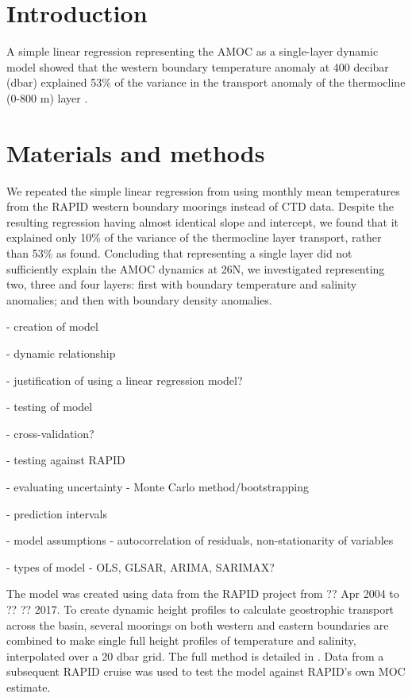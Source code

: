 \documentclass[a4paper,fleqn]{cas-sc}
\begin{document}
\maketitle


\section{Introduction}

A simple linear regression representing the AMOC as a single-layer dynamic model showed that the western boundary temperature anomaly at 400 decibar (dbar) explained 53\% of the variance in the transport anomaly of the thermocline (0-800 m) layer \citep{longworth2011}.

\section{Materials and methods}

We repeated the simple linear regression from \citet{longworth2011} using monthly mean temperatures from the RAPID western boundary moorings instead of CTD data. Despite the resulting regression having almost identical slope and intercept, we found that it explained only 10\% of the variance of the thermocline layer transport, rather than 53\% as \citet{longworth2011} found. Concluding that representing a single layer did not sufficiently explain the AMOC dynamics at 26\textdegree N, we investigated representing two, three and four layers: first with boundary temperature and salinity anomalies; and then with boundary density anomalies.

- creation of model

- dynamic relationship

- justification of using a linear regression model?

- testing of model

- cross-validation?

- testing against RAPID

- evaluating uncertainty - Monte Carlo method/bootstrapping

- prediction intervals

- model assumptions - autocorrelation of residuals, non-stationarity of variables

- types of model - OLS, GLSAR, ARIMA, SARIMAX?


The model was created using data from the RAPID project from ?? Apr 2004 to ?? ?? 2017. To create dynamic height profiles to calculate geostrophic transport across the basin, several moorings on both western and eastern boundaries are combined to make single full height profiles of temperature and salinity, interpolated over a 20 dbar grid. The full method is detailed in \cite{mccarthy2015}. Data from a subsequent RAPID cruise was used to test the model against RAPID's own MOC estimate.
\end{document}
